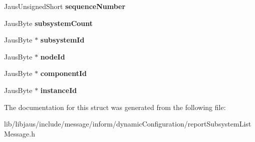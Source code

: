 \begin{DoxyCompactItemize}
\item 
\hypertarget{struct_report_subsystem_list_message_struct_a0b87462e79048f76afe46f732c7055c6}{\-Jaus\-Unsigned\-Short {\bfseries sequence\-Number}}\label{struct_report_subsystem_list_message_struct_a0b87462e79048f76afe46f732c7055c6}

\item 
\hypertarget{struct_report_subsystem_list_message_struct_a0881f39b9a90115d73905856852ebb36}{\-Jaus\-Byte {\bfseries subsystem\-Count}}\label{struct_report_subsystem_list_message_struct_a0881f39b9a90115d73905856852ebb36}

\item 
\hypertarget{struct_report_subsystem_list_message_struct_ab4dfb19cf22c6316f263df570500b3aa}{\-Jaus\-Byte $\ast$ {\bfseries subsystem\-Id}}\label{struct_report_subsystem_list_message_struct_ab4dfb19cf22c6316f263df570500b3aa}

\item 
\hypertarget{struct_report_subsystem_list_message_struct_a1689987ec8ce915a3629677c84b74cdf}{\-Jaus\-Byte $\ast$ {\bfseries node\-Id}}\label{struct_report_subsystem_list_message_struct_a1689987ec8ce915a3629677c84b74cdf}

\item 
\hypertarget{struct_report_subsystem_list_message_struct_ae37b700d68292734494d71af6e2c1875}{\-Jaus\-Byte $\ast$ {\bfseries component\-Id}}\label{struct_report_subsystem_list_message_struct_ae37b700d68292734494d71af6e2c1875}

\item 
\hypertarget{struct_report_subsystem_list_message_struct_ab4f0d8bb46dfd0172afd7a150821d346}{\-Jaus\-Byte $\ast$ {\bfseries instance\-Id}}\label{struct_report_subsystem_list_message_struct_ab4f0d8bb46dfd0172afd7a150821d346}

\end{DoxyCompactItemize}


\-The documentation for this struct was generated from the following file\-:\begin{DoxyCompactItemize}
\item 
lib/libjaus/include/message/inform/dynamic\-Configuration/report\-Subsystem\-List\-Message.\-h\end{DoxyCompactItemize}

